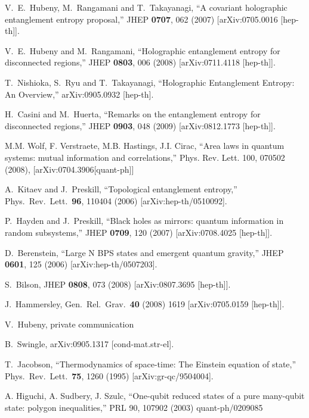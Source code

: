 \documentclass[12pt,epsf]{article}
\renewcommand{\(}{\left(}
\renewcommand{\)}{\right)}
\begin{document}
\begin{thebibliography}{999}
  V.~E.~Hubeny, M.~Rangamani and T.~Takayanagi,
  ``A covariant holographic entanglement entropy proposal,''
  JHEP {\bf 0707}, 062 (2007)
  [arXiv:0705.0016 [hep-th]].

  V.~E.~Hubeny and M.~Rangamani,
  ``Holographic entanglement entropy for disconnected regions,''
  JHEP {\bf 0803}, 006 (2008)
  [arXiv:0711.4118 [hep-th]].


  T.~Nishioka, S.~Ryu and T.~Takayanagi,
  ``Holographic Entanglement Entropy: An Overview,''
  arXiv:0905.0932 [hep-th].

  H.~Casini and M.~Huerta,
  ``Remarks on the entanglement entropy for disconnected regions,''
  JHEP {\bf 0903}, 048 (2009)
  [arXiv:0812.1773 [hep-th]].

M.M. Wolf, F. Verstraete, M.B. Hastings, J.I. Cirac,
``Area laws in quantum systems: mutual information and correlations,''
Phys. Rev. Lett. 100, 070502 (2008), [arXiv:0704.3906[quant-ph]]

  A.~Kitaev and J.~Preskill,
  ``Topological entanglement entropy,''
  Phys.\ Rev.\ Lett.\  {\bf 96}, 110404 (2006)
  [arXiv:hep-th/0510092].

  P.~Hayden and J.~Preskill,
  ``Black holes as mirrors: quantum information in random subsystems,''
  JHEP {\bf 0709}, 120 (2007)
  [arXiv:0708.4025 [hep-th]].

  D.~Berenstein,
  ``Large N BPS states and emergent quantum gravity,''
  JHEP {\bf 0601}, 125 (2006)
  [arXiv:hep-th/0507203].

  S.~Bilson,
  JHEP {\bf 0808}, 073 (2008)
  [arXiv:0807.3695 [hep-th]].

  J.~Hammersley,
  Gen.\ Rel.\ Grav.\  {\bf 40} (2008) 1619
  [arXiv:0705.0159 [hep-th]].

  V.~Hubeny, private communication

  B.~Swingle,
  arXiv:0905.1317 [cond-mat.str-el].

  T.~Jacobson,
  ``Thermodynamics of space-time: The Einstein equation of state,''
  Phys.\ Rev.\ Lett.\  {\bf 75}, 1260 (1995)
  [arXiv:gr-qc/9504004].

A. Higuchi, A. Sudbery, J. Szulc, ``One-qubit reduced states of a pure many-qubit state: polygon inequalities,'' PRL 90, 107902 (2003) quant-ph/0209085

\end{thebibliography}
\end{document}

